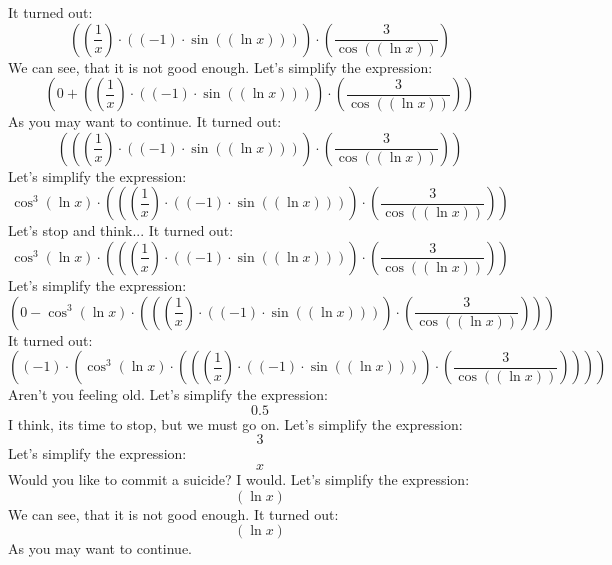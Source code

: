 \documentclass[12pt,a4paper]{scrartcl}
\begin{document}
It turned out: $$ \left(  \left(  \frac{1}{x} \right)  \cdot  \left(  \left( -1 \right)  \cdot  \sin  \left(  \left(  \ln x \right)  \right)  \right)  \right)  \cdot  \left(  \frac{3}{ \cos  \left(  \left(  \ln x \right)  \right) } \right) $$ We can see, that it is not good enough. 
Let's simplify the expression: $$ \left( 0+ \left(  \left(  \frac{1}{x} \right)  \cdot  \left(  \left( -1 \right)  \cdot  \sin  \left(  \left(  \ln x \right)  \right)  \right)  \right)  \cdot  \left(  \frac{3}{ \cos  \left(  \left(  \ln x \right)  \right) } \right)  \right) $$ As you may want to continue. 
It turned out: $$ \left(  \left(  \left(  \frac{1}{x} \right)  \cdot  \left(  \left( -1 \right)  \cdot  \sin  \left(  \left(  \ln x \right)  \right)  \right)  \right)  \cdot  \left(  \frac{3}{ \cos  \left(  \left(  \ln x \right)  \right) } \right)  \right) $$  
Let's simplify the expression: $$ \cos^{3}  \left(  \ln x \right)  \cdot  \left(  \left(  \left(  \frac{1}{x} \right)  \cdot  \left(  \left( -1 \right)  \cdot  \sin  \left(  \left(  \ln x \right)  \right)  \right)  \right)  \cdot  \left(  \frac{3}{ \cos  \left(  \left(  \ln x \right)  \right) } \right)  \right) $$ Let's stop and think... 
It turned out: $$ \cos^{3}  \left(  \ln x \right)  \cdot  \left(  \left(  \left(  \frac{1}{x} \right)  \cdot  \left(  \left( -1 \right)  \cdot  \sin  \left(  \left(  \ln x \right)  \right)  \right)  \right)  \cdot  \left(  \frac{3}{ \cos  \left(  \left(  \ln x \right)  \right) } \right)  \right) $$  
Let's simplify the expression: $$ \left( 0- \cos^{3}  \left(  \ln x \right)  \cdot  \left(  \left(  \left(  \frac{1}{x} \right)  \cdot  \left(  \left( -1 \right)  \cdot  \sin  \left(  \left(  \ln x \right)  \right)  \right)  \right)  \cdot  \left(  \frac{3}{ \cos  \left(  \left(  \ln x \right)  \right) } \right)  \right)  \right) $$  
It turned out: $$ \left(  \left( -1 \right)  \cdot  \left(  \cos^{3}  \left(  \ln x \right)  \cdot  \left(  \left(  \left(  \frac{1}{x} \right)  \cdot  \left(  \left( -1 \right)  \cdot  \sin  \left(  \left(  \ln x \right)  \right)  \right)  \right)  \cdot  \left(  \frac{3}{ \cos  \left(  \left(  \ln x \right)  \right) } \right)  \right)  \right)  \right) $$ Aren't you feeling old. 
Let's simplify the expression: $$0.5$$ I think, its time to stop, but we must go on. 
Let's simplify the expression: $$3$$  
Let's simplify the expression: $$x$$ Would you like to commit a suicide? I would. 
Let's simplify the expression: $$ \left(  \ln x \right) $$ We can see, that it is not good enough. 
It turned out: $$ \left(  \ln x \right) $$ As you may want to continue. 
\end{document}
